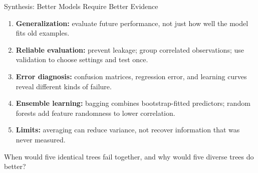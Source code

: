 \documentclass[aspectratio=169,10pt]{beamer}
\begin{document}
\begin{frame}[t]{Synthesis: Better Models Require Better Evidence}
\small
\begin{enumerate}
 \item \textbf{Generalization:} evaluate future performance, not just how well the model fits old examples.
 \item \textbf{Reliable evaluation:} prevent leakage; group correlated observations; use validation to choose settings and test once.
 \item \textbf{Error diagnosis:} confusion matrices, regression error, and learning curves reveal different kinds of failure.
 \item \textbf{Ensemble learning:} bagging combines bootstrap-fitted predictors; random forests add feature randomness to lower correlation.
 \item \textbf{Limits:} averaging can reduce variance, not recover information that was never measured.
\end{enumerate}
\begin{keyidea}When would five identical trees fail together, and why would five diverse trees do better?\end{keyidea}
\end{frame}
\end{document}
